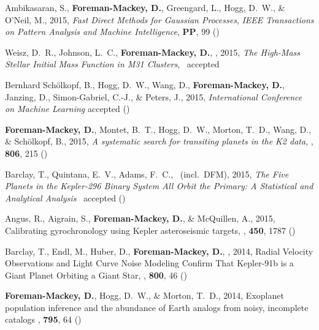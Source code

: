 \item Ambikasaran, S., {\bf Foreman-Mackey, D.}, Greengard, L., Hogg, D.~W.,
    \& O'Neil, M., 2015,
    \emph{Fast Direct Methods for Gaussian Processes},
    \emph{IEEE Transactions on Pattern Analysis and Machine Intelligence},
    {\bf PP}, 99 ()

\item Weisz, D.~R., Johnson, L.~C., {\bf Foreman-Mackey, D.}, \etal, 2015,
    \emph{The High-Mass Stellar Initial Mass Function in M31 Clusters},
    \apj\ accepted 

\item Bernhard Sch\"olkopf, B., Hogg, D.~W., Wang, D., {\bf Foreman-Mackey,
    D.}, Janzing, D., Simon-Gabriel, C.-J., \& Peters, J., 2015,
    \emph{International Conference on Machine Learning} accepted
    ()

\item {\bf Foreman-Mackey, D.}, Montet, B.~T., Hogg, D.~W., Morton, T.~D.,
    Wang, D., \& Sch\"olkopf, B., 2015,
    \emph{A systematic search for transiting planets in the K2 data},
    \apj, \textbf{806}, 215 ()

\item Barclay, T., Quintana, E.~V., Adams, F.~C., \etal\ (incl.\ DFM), 2015,
    \emph{The Five Planets in the Kepler-296 Binary System All Orbit the
          Primary: A Statistical and Analytical Analysis}
    \apj\ accepted ()

\item Angus, R., Aigrain, S., {\bf Foreman-Mackey, D.}, \& McQuillen, A., 2015,
        {Calibrating gyrochronology using Kepler asteroseismic targets},
    \mnras, \textbf{450}, 1787 ()

\item Barclay, T., Endl, M.,  Huber, D., {\bf Foreman-Mackey, D.}, \etal, 2014,
        {Radial Velocity Observations and Light Curve Noise Modeling Confirm
         That Kepler-91b is a Giant Planet Orbiting a Giant Star},
    \apj, \textbf{800}, 46 ()

\item {\bf Foreman-Mackey, D.}, Hogg, D.~W., \& Morton, T.~D., 2014,
        {Exoplanet population inference and the abundance of Earth analogs
         from noisy, incomplete catalogs}
    \apj, \textbf{795}, 64 ()

